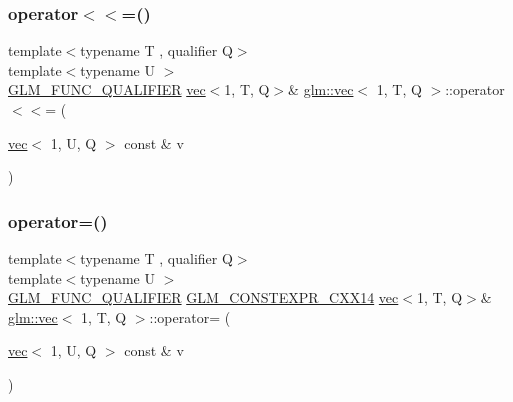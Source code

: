 \mbox{\label{structglm_1_1vec_3_011_00_01_t_00_01_q_01_4_a129ec8874e812e787c380255b92468fa}} 
\subsubsection{\texorpdfstring{operator$<$$<$=()}{operator<<=()}\hspace{0.1cm}{\footnotesize\ttfamily [4/4]}}
{\footnotesize\ttfamily template$<$typename T , qualifier Q$>$ \\
template$<$typename U $>$ \\
\hyperlink{setup_8hpp_a33fdea6f91c5f834105f7415e2a64407}{G\+L\+M\+\_\+\+F\+U\+N\+C\+\_\+\+Q\+U\+A\+L\+I\+F\+I\+ER} \hyperlink{structglm_1_1vec}{vec}$<$1, T, Q$>$\& \hyperlink{structglm_1_1vec}{glm\+::vec}$<$ 1, T, Q $>$\+::operator$<$$<$= (\begin{DoxyParamCaption}\item[{\hyperlink{structglm_1_1vec}{vec}$<$ 1, U, Q $>$ const \&}]{v }\end{DoxyParamCaption})}

\mbox{\label{structglm_1_1vec_3_011_00_01_t_00_01_q_01_4_a5b41960ee625ae1959386beea2e587f2}} 
\subsubsection{\texorpdfstring{operator=()}{operator=()}\hspace{0.1cm}{\footnotesize\ttfamily [1/3]}}
{\footnotesize\ttfamily template$<$typename T , qualifier Q$>$ \\
template$<$typename U $>$ \\
\hyperlink{setup_8hpp_a33fdea6f91c5f834105f7415e2a64407}{G\+L\+M\+\_\+\+F\+U\+N\+C\+\_\+\+Q\+U\+A\+L\+I\+F\+I\+ER} \hyperlink{setup_8hpp_a4dd12abf5e1164bc57f3a34671d03844}{G\+L\+M\+\_\+\+C\+O\+N\+S\+T\+E\+X\+P\+R\+\_\+\+C\+X\+X14} \hyperlink{structglm_1_1vec}{vec}$<$1, T, Q$>$\& \hyperlink{structglm_1_1vec}{glm\+::vec}$<$ 1, T, Q $>$\+::operator= (\begin{DoxyParamCaption}\item[{\hyperlink{structglm_1_1vec}{vec}$<$ 1, U, Q $>$ const \&}]{v }\end{DoxyParamCaption})}




